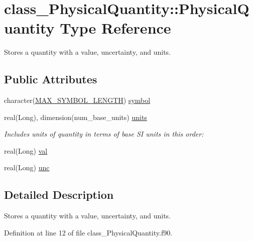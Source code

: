 \hypertarget{typeclass__PhysicalQuantity_1_1PhysicalQuantity}{
\section{class\_\-PhysicalQuantity::PhysicalQuantity Type Reference}
\label{typeclass__PhysicalQuantity_1_1PhysicalQuantity}
}


Stores a quantity with a value, uncertainty, and units.  


\subsection*{Public Attributes}
\begin{DoxyCompactItemize}
\item 
character(\hyperlink{namespaceclass__PhysicalQuantity_a9a49f0ad012c6d03a17e68cc71867a2d}{MAX\_\-SYMBOL\_\-LENGTH}) \hyperlink{typeclass__PhysicalQuantity_1_1PhysicalQuantity_a2f981d73988825d1960abd97a8abfb8f}{symbol}
\item 
real(Long), dimension(num\_\-base\_\-units) \hyperlink{typeclass__PhysicalQuantity_1_1PhysicalQuantity_a3d431173fc79af5743037ff1f68237d3}{units}
\begin{DoxyCompactList}\small\item\em Includes units of quantity in terms of base SI units in this order: \item\end{DoxyCompactList}\item 
real(Long) \hyperlink{typeclass__PhysicalQuantity_1_1PhysicalQuantity_ae362510ba84f98322e31cd40193a4d26}{val}
\item 
real(Long) \hyperlink{typeclass__PhysicalQuantity_1_1PhysicalQuantity_abb0c17659fe335d551d4e715b84e9743}{unc}
\end{DoxyCompactItemize}


\subsection{Detailed Description}
Stores a quantity with a value, uncertainty, and units. 

Definition at line 12 of file class\_\-PhysicalQuantity.f90.




